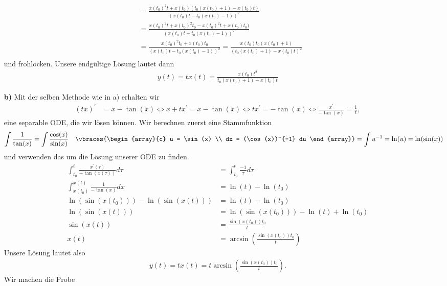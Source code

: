\begin{solution}
\begin{itemize}
\begin{align*}
    &= \frac{x(t_0)^2t + x(t_0)(t_0(x(t_0) + 1) - x(t_0)t)}{(x(t_0)t - t_0(x(t_0) - 1))^2}\\
    &= \frac{x(t_0)^2t + x(t_0)^2t_0 - x(t_0)^2t + x(t_0)t_0)}{(x(t_0)t - t_0(x(t_0) - 1))^2}\\
    &= \frac{x(t_0)^2t_0 + x(t_0)t_0}{(x(t_0)t - t_0(x(t_0) - 1))^2}
    = \frac{x(t_0)t_0(x(t_0) + 1)}{(t_0(x(t_0) + 1) - x(t_0)t)^2}\\
  \end{align*}
  und frohlocken.
  Unsere endgültige Lösung lautet dann
  \begin{align*}
    y(t) = tx(t) = \frac{x(t_0)t^2}{t_0(x(t_0) + 1) - x(t_0)t}
  \end{align*}
  \item [\textbf{b)}]
  Mit der selben Methode wie in a) erhalten wir
  \begin{align*}
    (tx)^{\prime} &= x - \tan(x) \iff x + tx^\prime = x - \tan(x) \iff tx^\prime = -\tan(x) \iff \frac{x^{\prime}}{-\tan(x)} = \frac{1}{t},
  \end{align*}
  eine separable ODE, die wir lösen können.
  Wir berechnen zuerst eine Stammfunktion
  \begin{align*}
    \int \frac{1}{\tan(x)} = \int \frac{\cos(x)}{\sin(x)} \quad \vbraces{\begin{array}{c} u = \sin(x) \\ dx = (\cos(x))^{-1} du \end{array}} = \int u^{-1} = \ln(u) = \ln(\sin(x))
  \end{align*}
  und verwenden das um die Lösung unserer ODE zu finden.
  \begin{align*}
    \int_{t_0}^t \frac{x^{\prime}(\tau)}{-\tan(x(\tau))}d\tau &= \int_{t_0}^t \frac{-1}{\tau}d\tau \\
    \int_{x(t_0)}^{x(t)} \frac{1}{-\tan(x)}dx &= \ln(t) - \ln(t_0) \\
    \ln(\sin(x(t_0))) - \ln(\sin(x(t))) &= \ln(t) - \ln(t_0) \\
    \ln(\sin(x(t))) &= \ln(\sin(x(t_0))) - \ln(t) + \ln(t_0) \\
    \sin(x(t)) &= \frac{\sin(x(t_0))t_0}{t} \\
    x(t) &= \arcsin\left(\frac{\sin(x(t_0))t_0}{t}\right)
  \end{align*}
  Unsere Lösung lautet also
  \begin{align*}
    y(t) = tx(t) = t\arcsin\left(\frac{\sin(x(t_0))t_0}{t}\right).
  \end{align*}
  Wir machen die Probe
  \begin{align*}

\end{align*}
\end{itemize}
\end{solution}
